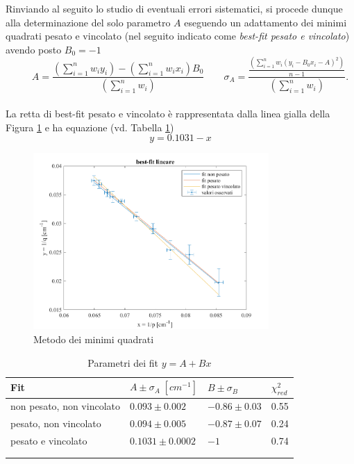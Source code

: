 \documentclass[11pt,a4paper]{article}
\begin{document}
Rinviando al seguito lo studio di eventuali errori sistematici, si procede dunque alla determinazione del solo parametro $A$ eseguendo un adattamento dei minimi quadrati pesato e vincolato  (nel seguito indicato come \textit{best-fit pesato e vincolato}) avendo posto $B_0 = -1$
\\
\begin{equation}
 \qquad{A=\frac{\left(\sum_{i=1}^n w_i y_i\right)-\left(\sum_{i=1}^n w_i x_i\right) B_0}{\left(\sum_{i=1}^n w_i\right)}}
 \qquad{\sigma_A = \frac{\frac{\left(\sum_{i=1}^n w_i\left(y_i - B_0 x_i - A\right)^2\right)}{n-1}}{\left(\sum_{i=1}^n w_i\right)}}.
\end{equation}
\\
La retta di best-fit pesato e vincolato è rappresentata dalla linea gialla della Figura \ref{fig:fit} e ha equazione (vd. Tabella \ref{tab:fit-params})
\begin{equation}
    y = 0.1031 -x
    \label{eq:fit-vincolato}
\end{equation}

\begin{figure}[H]
    \centering
    \includegraphics[width=0.8\textwidth]{fit.png}
    \caption{Metodo dei minimi quadrati}
    \label{fig:fit}
\end{figure}

\begin{longtable}{@{}llll@{}}
\toprule
Fit & $A \pm \sigma_A \; [cm^{-1}]$ & $B \pm \sigma_B$ & $\chi_{red}^2$ \tabularnewline
\midrule
non pesato, non vincolato & $0.093 \pm 0.002$ & $-0.86 \pm 0.03$ & 0.55 \tabularnewline
pesato, non vincolato & $0.094 \pm 0.005$ & $-0.87 \pm 0.07$ & 0.24 \tabularnewline
pesato e vincolato & $0.1031 \pm 0.0002$ & $-1$ & 0.74 \tabularnewline
\bottomrule
\label{tab:fit-params}
\\
\caption{Parametri dei fit $y = A +Bx$}
\end{longtable}
\end{document}

